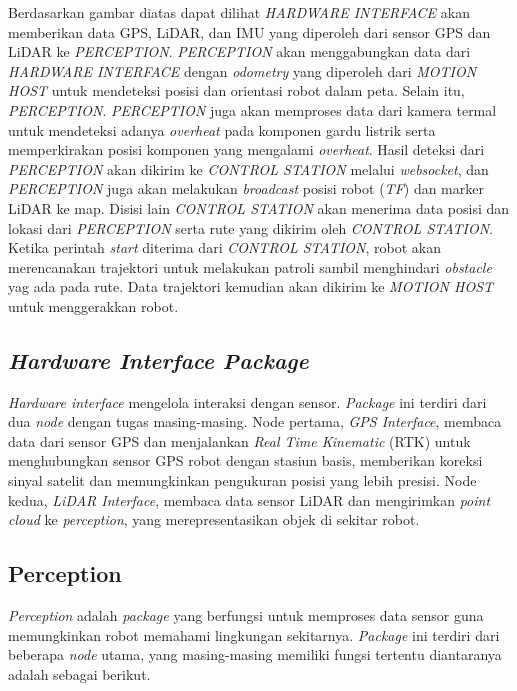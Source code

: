 Berdasarkan gambar diatas dapat dilihat \emph{HARDWARE INTERFACE} akan memberikan data GPS, LiDAR, dan IMU yang diperoleh dari sensor GPS dan LiDAR ke \emph{PERCEPTION}. \emph{PERCEPTION} akan menggabungkan data dari \emph{HARDWARE INTERFACE} dengan \emph{odometry} yang diperoleh dari \emph{MOTION HOST} untuk mendeteksi posisi dan orientasi robot dalam peta. Selain itu, \emph{PERCEPTION}. \emph{PERCEPTION}  juga akan memproses data dari kamera termal untuk mendeteksi adanya \emph{overheat} pada komponen gardu listrik serta memperkirakan posisi komponen yang mengalami \emph{overheat}. Hasil deteksi dari \emph{PERCEPTION} akan dikirim ke \emph{CONTROL STATION} melalui \emph{websocket}, dan \emph{PERCEPTION} juga akan melakukan \emph{broadcast} posisi robot (\emph{TF}) dan marker LiDAR ke map.  Disisi lain \emph{CONTROL STATION} akan menerima data posisi dan lokasi dari \emph{PERCEPTION} serta rute yang dikirim oleh \emph{CONTROL STATION}. Ketika perintah \emph{start} diterima dari \emph{CONTROL STATION}, robot akan merencanakan trajektori untuk melakukan patroli sambil menghindari \emph{obstacle} yag ada pada rute. Data trajektori kemudian akan dikirim ke \emph{MOTION HOST} untuk menggerakkan robot. 

\subsection{\emph{Hardware Interface Package}}
\emph{Hardware interface} mengelola interaksi dengan sensor. \emph{Package} ini terdiri dari dua \emph{node} dengan tugas masing-masing. Node pertama, \emph{GPS Interface}, membaca data dari sensor GPS dan menjalankan \emph{Real Time Kinematic} (RTK) untuk menghubungkan sensor GPS robot dengan stasiun basis, memberikan koreksi sinyal satelit dan memungkinkan pengukuran posisi yang lebih presisi. Node kedua, \emph{LiDAR Interface}, membaca data sensor LiDAR dan mengirimkan \emph{point cloud} ke \emph{perception}, yang merepresentasikan objek di sekitar robot.

\subsection{Perception}
\emph{Perception} adalah \emph{package} yang berfungsi untuk memproses data sensor guna memungkinkan robot memahami lingkungan sekitarnya. \emph{Package} ini terdiri dari beberapa \emph{node} utama, yang masing-masing memiliki fungsi tertentu diantaranya adalah sebagai berikut.

